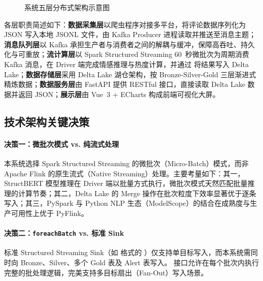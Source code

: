 \begin{figure}[htbp]
{}%
\caption{系统五层分布式架构示意图}
\label{fig:architecture}
\end{figure}

各层职责简述如下：\textbf{数据采集层}以爬虫程序对接多平台，将评论数据序列化为 JSON 写入本地 JSONL 文件，由 Kafka Producer 进程读取并推送至消息主题；\textbf{消息队列层}以 Kafka 承担生产者与消费者之间的解耦与缓冲，保障高吞吐、持久化与可重放；\textbf{流计算层}以 Spark Structured Streaming 60~秒微批次为周期消费 Kafka 消息，在 Driver 端完成情感推理与热度计算，并通过  将结果写入 Delta Lake；\textbf{数据存储层}采用 Delta Lake 湖仓架构，按 Bronze-Silver-Gold 三层渐进式精炼数据；\textbf{数据服务层}由 FastAPI 提供 RESTful 接口，直接读取 Delta Lake 数据并返回 JSON；\textbf{展示层}由 Vue~3 + ECharts 构成前端可视化大屏。

\subsection{技术架构关键决策}

\paragraph{决策一：微批次模式 vs. 纯流式处理}
本系统选择 Spark Structured Streaming 的微批次（Micro-Batch）模式，而非 Apache Flink 的原生流式（Native Streaming）处理。主要考量如下：其一，StructBERT 模型推理在 Driver 端以批量方式执行，微批次模式天然匹配批量推理的计算节奏；其二，Delta Lake 的 Merge 操作在批次粒度下效率显著优于逐条写入；其三，PySpark 与 Python NLP 生态（ModelScope）的结合在成熟度与生产可用性上优于 PyFlink。

\paragraph{决策二：\texttt{foreachBatch} vs. 标准 Sink}
标准 Structured Streaming Sink（如  格式的 ）仅支持单目标写入，而本系统需同时向 Bronze、Silver、多个 Gold 表及 Alert 表写入。 接口允许在每个批次内执行完整的批处理逻辑，完美支持多目标扇出（Fan-Out）写入场景。

